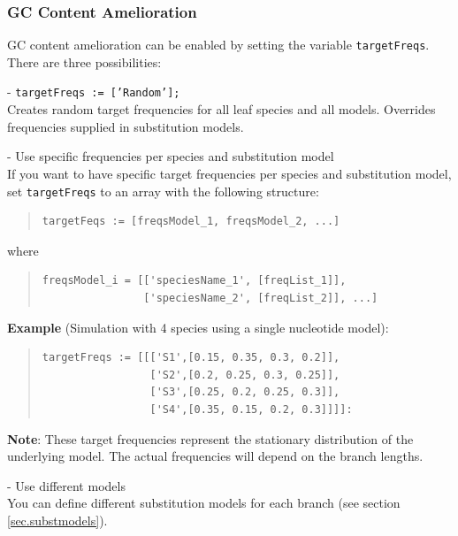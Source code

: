 \documentclass[11pt]{article}
\begin{document}
\subsubsection{GC Content Amelioration}
GC content amelioration can be enabled by setting the variable \texttt{targetFreqs}. There are three possibilities:
\begin{description}
\item{- \texttt{targetFreqs := ['Random'];}} \hfill \\
Creates random target frequencies for all leaf species and all models. Overrides frequencies supplied in substitution models.

\item{- Use specific frequencies per species and substitution model} \hfill \\
If you want to have specific target frequencies per species and substitution model, set \texttt{targetFreqs} to an array with the following structure:
\begin{quote}
\begin{verbatim}
targetFeqs := [freqsModel_1, freqsModel_2, ...]
\end{verbatim}
\end{quote}
where
\begin{quote}
\begin{verbatim}
freqsModel_i = [['speciesName_1', [freqList_1]],
                ['speciesName_2', [freqList_2]], ...]
\end{verbatim}
\end{quote}

\noindent \textbf{Example} (Simulation with 4 species using a single nucleotide model):
\begin{quote}
\begin{verbatim}
targetFreqs := [[['S1',[0.15, 0.35, 0.3, 0.2]],
                 ['S2',[0.2, 0.25, 0.3, 0.25]],
                 ['S3',[0.25, 0.2, 0.25, 0.3]],
                 ['S4',[0.35, 0.15, 0.2, 0.3]]]]:
\end{verbatim}
\end{quote}

\noindent \textbf{Note}: These target frequencies represent the stationary distribution of the underlying model. The actual frequencies will depend on the branch lengths.

\item{- Use different models} \hfill \\
You can define different substitution models for each branch (see section \ref{sec.substmodels}).
\end{description}
\end{document}
